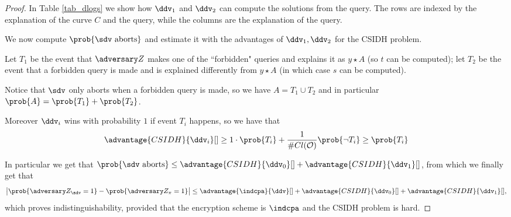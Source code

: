 \begin{proof}
    In Table \ref{tab_dlogs} we show how $\ddv_1$ and $\ddv_2$ can compute the solutions from the query. The rows are indexed by the explanation of the curve $C$ and the query, while the columns are the explanation of the query.
    
    \begin{table}[]
        \centering
        \caption{The computable solutions to the CSIDH problem}
        \label{tab_dlogs}
    \end{table}
    
    We now compute $\prob{\sdv\text{ aborts}}$ and estimate it with the advantages of $\ddv_1,\ddv_2$ for the CSIDH problem.
    
    Let $T_1$ be the event that $\zdv$ makes one of the ``forbidden" queries and explains it as $y\star A$ (so $t$ can be computed); let $T_2$ be the event that a forbidden query is made and is explained differently from $y\star A$ (in which case $s$ can be computed).
    
    Notice that $\sdv$ only aborts when a forbidden query is made, so we have $A=T_1\cup T_2$ and in particular $\prob{A}=\prob{T_1}+\prob{T_2}$.
    
    Moreover $\ddv_i$ wins with probability $1$ if event $T_i$ happens, so we have that $$\advantage{CSIDH}{\ddv_i}[]\ge 1\cdot \prob{T_i} + \frac{1}{\# Cl(\Oc)}\prob{\neg T_i}\ge\prob{T_i}$$
    
    In particular we get that $\prob{\sdv\text{ aborts}} \le \advantage{CSIDH}{\ddv_0}[] + \advantage{CSIDH}{\ddv_1}[]$, from which we finally get that
    $$ \left|\prob{\zdv_\sdv=1}-\prob{\zdv_\pi=1}\right| \le \advantage{\indcpa}{\ddv}[] + \advantage{CSIDH}{\ddv_0}[] + \advantage{CSIDH}{\ddv_1}[], $$
    which proves indistinguishability, provided that the encryption scheme is $\indcpa$ and the CSIDH problem is hard.
    
\end{proof}


